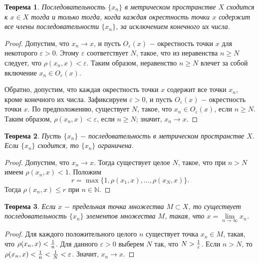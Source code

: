 \documentclass{article}
\newtheorem{theorem}{Теорема}[section]
\begin{document}
\begin{theorem}
Последовательность \(\{x_n\}\) в метрическом пространстве \(X\) сходится к \(x \in X\) тогда и только тогда, когда каждая окрестность точки \(x\) содержит все члены последовательности \(\{x_n\}\), за исключением конечного их числа.
\end{theorem}

\begin{proof}
Допустим, что \(x_n \to x\), и пусть \(O_\varepsilon(x)\) \(-\) окрестность точки \(x\) для некоторого \(\varepsilon > 0\). Этому \(\varepsilon\) соответствует \(N\), такое, что из неравенства \(n \geq N\) следует, что \(\rho(x_n, x) < \varepsilon\). Таким образом, неравенство \(n \geq N\) влечет за собой включение \(x_n \in O_\varepsilon(x)\).

Обратно, допустим, что каждая окрестность точки \(x\) содержит все точки \(x_n\), кроме конечного их числа. Зафиксируем \(\varepsilon > 0\), и пусть \(O_\varepsilon(x)\) \(-\) окрестность точки \(x\). По предположению, существует \(N\), такое, что \(x_n \in O_\varepsilon(x)\), если \(n \geq N\). Таким образом, \(\rho(x_n, x) < \varepsilon\), если \(n \geq N\); значит, \(x_n \to x\).
\end{proof}

\begin{theorem}
Пусть \(\{x_n\}\) \(-\) последовательность в метрическом пространстве \(X\). Если \(\{x_n\}\) сходится, то \(\{x_n\}\) ограничена.
\end{theorem}

\begin{proof}
Допустим, что \(x_n \to x\). Тогда существует целое \(N\), такое, что при \(n > N\) имеем \(\rho(x_n, x) < 1\). Положим
\[
r = \max\{1, \rho(x_1, x), ..., \rho(x_N, x)\}.
\]
Тогда \(\rho(x_n, x) \leq r\) при \(n \in \mathbb{N}\).
\end{proof}

\begin{theorem}
Если \(x\) \(-\) предельная точка множества \(M \subset X\), то существует последовательность \(\{x_n\}\) элементов множества \(M\), такая, что \(x = \lim\limits_{n \to \infty} x_n\).
\end{theorem}

\begin{proof}
Для каждого положительного целого \(n\) существует точка \(x_n \in M\), такая, что \(\rho(x_n, x) < {{1} \over {n}}\). Для данного \(\varepsilon > 0\) выберем \(N\) так, что \(N > {1 \over \varepsilon}\). Если \(n > N\), то \(\rho(x_n, x) < {1 \over n} < {1 \over N} < \varepsilon\). Значит, \(x_n \to x\).
\end{proof}
\end{document}
